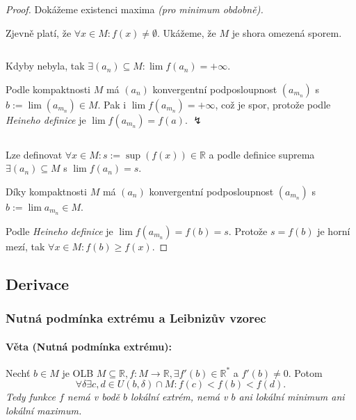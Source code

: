 \documentclass[10pt,a4paper]{article}
\newcommand{\R}{{\mathbb{R}}}
\begin{document}
\begin{proof}
    Dokážeme existenci maxima \textit{(pro minimum obdobně).}

    Zjevně platí, že $\forall x \in M: f(x) \neq \emptyset$. 
    Ukážeme, že $M$ je shora omezená sporem.

    $ $

    Kdyby nebyla, tak $\exists (a_n) \subseteq M : \lim f(a_n) = +\infty$. 

    Podle kompaktnosti $M$ má $(a_n)$ konvergentní podposloupnost $(a_{m_n})$ s $b := \lim (a_{m_n}) \in M$. 
    Pak i $\lim f (a_{m_n}) = +\infty$, což je spor, protože podle \textit{Heineho definice} je $\lim f(a_{m_n}) = f(a)$. $\lightning$

    $ $

    Lze definovat $\forall x \in M: s:=\sup(f(x))\in \R$ a podle definice suprema $\exists (a_n)\subseteq M$ s $\lim f(a_n) = s$.
    
    Díky kompaktnosti $M$ má $(a_n)$ konvergentní podposloupnost $(a_{m_n})$ s $b := \lim a_{m_n} \in M$. 
    
    Podle \textit{Heineho definice} je $\lim f(a_{m_n}) = f(b) = s$. 
    Protože $s = f(b)$ je horní mezí, tak $\forall x \in M: f(b) \geq f (x)$.
    

\end{proof}

\subsection{Derivace}

\subsubsection{Nutná podmínka extrému a Leibnizův vzorec}

\paragraph*{Věta (Nutná podmínka extrému):} Nechť $b\in M$ je OLB $M\subseteq \R, f:M\to \R, \exists f'(b)\in \R^*$ a $f'(b)\neq 0$. Potom
\[
    \forall \delta \exists c, d\in U(b, \delta) \cap M: f(c) < f(b) < f(d).
\] \textit{Tedy funkce $f$ nemá v bodě $b$ lokální extrém, nemá v $b$ ani lokální minimum ani lokální maximum.}
\end{document}
